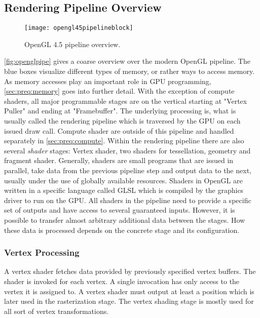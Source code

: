 \documentclass[thesis.tex]{subfiles}
\begin{document}

\subsection{Rendering Pipeline Overview}
\begin{figure}[h]
\centering
\texttt{[image: opengl45pipelineblock]}
\caption{\cite{bib:openglspec} OpenGL 4.5 pipeline overview.}
\label{fig:openglpipe}
\end{figure}
\autoref{fig:openglpipe} gives a coarse overview over the modern OpenGL pipeline.
The blue boxes visualize different types of memory, or rather ways to access memory.
As memory accesses play an important role in GPU programming, \autoref{sec:preq:memory} goes into further detail.
With the exception of compute shaders, all major programmable stages are on the vertical starting at "Vertex Puller" and ending at "Framebuffer".
The underlying processing is, what is usually called the rendering pipeline which is traversed by the GPU on each issued draw call.
Compute shader are outside of this pipeline and handled separately in \autoref{sec:preq:compute}.
Within the rendering pipeline there are also several \emph{shader} stages: Vertex shader, two shaders for tessellation, geometry and fragment shader.
Generally, shaders are small programs that are issued in parallel, take data from the previous pipeline step and output data to the next, usually under the use of globally available resources.
Shaders in OpenGL are written in a specific language called GLSL which is compiled by the graphics driver to run on the GPU.
All shaders in the pipeline need to provide a specific set of outputs and have access to several guaranteed inputs.
However, it is possible to transfer almost arbitrary additional data between the stages.
How these data is processed depends on the concrete stage and its configuration.

\subsubsection{Vertex Processing}
A vertex shader fetches data provided by previously specified vertex buffers.
The shader is invoked for each vertex.
A single invocation has only access to the vertex it is assigned to.
A vertex shader must output at least a position which is later used in the rasterization stage.
The vertex shading stage is mostly used for all sort of vertex transformations.
\end{document}
